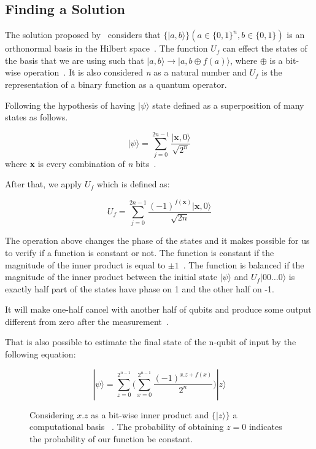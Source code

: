 \documentclass[conference]{IEEEtran}
\begin{document}
\subsection{Finding a Solution}\label{subsec:finding-a-solution}

The solution proposed by~\cite{deutsch1992rapid} considers that \(\{{|a,b\rangle\}}(a \in \{{0,1\}}^n, b \in \{0,1\})\) is an
orthonormal basis in the Hilbert space~\cite{deutsch1992rapid}.
The function \(U_f\) can effect the states of the basis that we are using such that \(|a,b\rangle \rightarrow |a,b \oplus f(a) \rangle\),
where \(\oplus\) is a bit-wise operation~\cite{deutsch1992rapid}.
It is also considered \textit{n} as a natural number and \(U_f\) is the representation of a binary function as a quantum
operator.

Following the hypothesis of having \(|\psi\rangle\) state defined as a
superposition of many states as follows.

 \begin{equation}
    |\psi\rangle = \sum_{j=0}^{2n-1} \frac{|\textbf{x},0\rangle}{\sqrt{2^n}}
 \end{equation}
 where \textbf{x} is every combination of \textit{n} bits~\cite{deutsch1992rapid}.

 After that, we apply \(U_f\) which is defined as:

 \begin{equation}
    U_f = \sum_{j=0}^{2n-1} \frac{{(-1)}^{f(\textbf{x})}|\textbf{x},0\rangle}{\sqrt{2n}}
 \end{equation}

 The operation above changes the phase of the states and it makes possible for us to verify if a function is constant or
 not.
 The function is constant if the magnitude of the inner product is equal to
 \(\pm 1\)~\cite{deutsch1992rapid,yanofsky2008quantum}.
 The function is balanced if the magnitude of the inner product between the initial state \(|\psi\rangle\)
 and \(U_f|00\dots0\rangle\) is exactly half part of the states have phase on 1 and the other half on -1.

 It will make one-half cancel with another half of qubits and produce some output different from zero after the
 measurement~\cite{deutsch1992rapid,nielsen2002quantum}.

 That is also possible to estimate the final state of the n-qubit of input by the following equation:

\renewcommand{\figurename}{Fig.}
 \begin{figure}[ht!]
     \begin{equation}
        |\psi\rangle = \sum_{z=0}^{2^{n-1}} \Bigg(\sum_{x=0}^{2^{n-1}} \frac{{(-1)}^{x.z +f(x)}}{2^n}\Bigg)|z\rangle
    \end{equation}
     \caption{Considering \(x.z\) as a bit-wise inner product and \(\{|z\rangle\}\) a computational basis
     ~\cite{benatti2003deciding}.
     The probability of obtaining \(z=0\) indicates the probability of our function be constant.}
 \end{figure}
\end{document}
